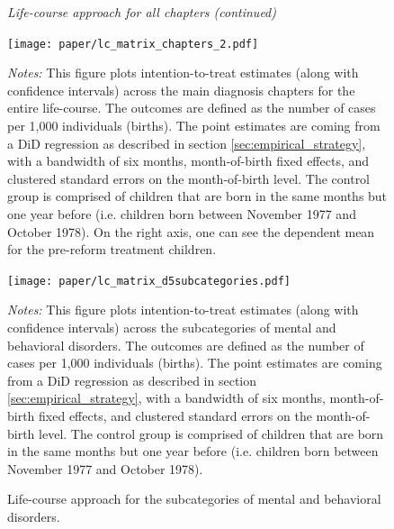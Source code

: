 \documentclass[11pt, a4paper,draft]{article} %
\begin{document}
\begin{figure}[H]\centering
		\begin{minipage}{\linewidth}\scriptsize
		\begin{center} \emph{Life-course approach for all chapters (continued)}\end{center}
	\end{minipage}
	\texttt{[image: paper/lc\_matrix\_chapters\_2.pdf]}
		\begin{minipage}{\linewidth}
		\scriptsize \emph{Notes:} This figure plots intention-to-treat estimates (along with confidence intervals) across the main diagnosis chapters for the entire life-course. The outcomes are defined as the number of cases per 1,000 individuals (births). The point estimates are coming from a DiD regression as described in section \ref{sec:empirical_strategy}, with a bandwidth of six months, month-of-birth fixed effects, and clustered standard errors on the month-of-birth level. The control group is comprised of children that are born in the same months but one year before (i.e. children born between November 1977 and October 1978). On the right axis, one can see the dependent mean for the pre-reform treatment children.
	\end{minipage}
\end{figure}
\begin{figure}[H]\centering
	\caption{Life-course approach for the subcategories of mental and behavioral disorders.}\label{fig: appendix_lc_matrix_d5_subcateg}
	\texttt{[image: paper/lc\_matrix\_d5subcategories.pdf]}
		\begin{minipage}{\linewidth}
		\scriptsize \emph{Notes:} This figure plots intention-to-treat estimates (along with confidence intervals) across the subcategories of mental and behavioral disorders. The outcomes are defined as the number of cases per 1,000 individuals (births). The point estimates are coming from a DiD regression as described in section \ref{sec:empirical_strategy}, with a bandwidth of six months, month-of-birth fixed effects, and clustered standard errors on the month-of-birth level. The control group is comprised of children that are born in the same months but one year before (i.e. children born between November 1977 and October 1978).
	\end{minipage}
\end{figure}

\renewcommand\thetable{A\arabic{table}}
\setcounter{table}{0} 
\end{document}

